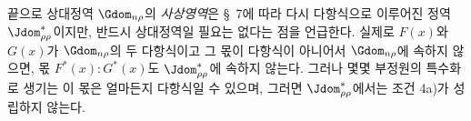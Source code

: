 
끝으로 상대정역 $\Gdom_{n\rho}$의 \emph{사상영역}은 \S\ 7에 따라 다시 다항식으로 이루어진 정역 $\Jdom^*_{\rho\rho}$이지만, 반드시 상대정역일 필요는 없다는 점을 언급한다. 실제로 $F(x)$와 $G(x)$가 $\Gdom_{n\rho}$의 두 다항식이고 그 몫이 다항식이 아니어서 $\Gdom_{n\rho}$에 속하지 않으면, 몫 $F^*(x):G^*(x)$도 $\Jdom^*_{\rho\rho}$에 속하지 않는다. 그러나 몇몇 부정원의 특수화로 생기는 이 몫은 얼마든지 다항식일 수 있으며, 그러면 $\Jdom^*_{\rho\rho}$에서는 조건 4a)가 성립하지 않는다.
